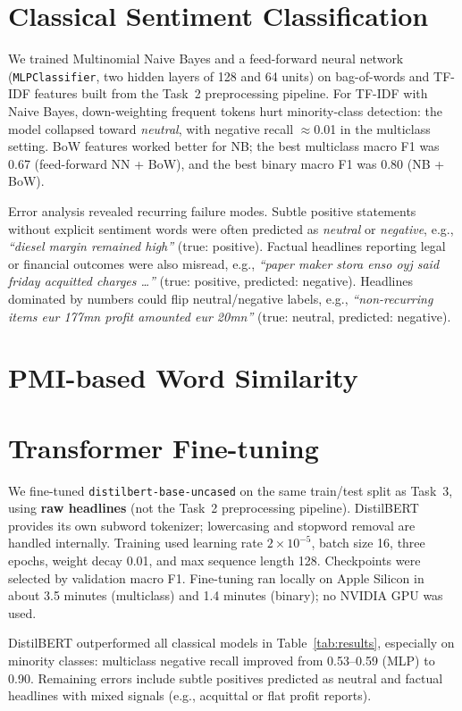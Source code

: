 \documentclass[sigconf,nonacm]{acmart}
\begin{document}
\section{Classical Sentiment Classification}

We trained Multinomial Naive Bayes and a feed-forward neural network
(\texttt{MLPClassifier}, two hidden layers of 128 and 64 units) on bag-of-words
and TF-IDF features built from the Task~2 preprocessing pipeline.
For TF-IDF with Naive Bayes, down-weighting frequent tokens hurt minority-class
detection: the model collapsed toward \emph{neutral}, with negative recall
$\approx$0.01 in the multiclass setting.
BoW features worked better for NB; the best multiclass macro F1 was
0.67 (feed-forward NN + BoW), and the best binary macro F1 was 0.80 (NB + BoW).

Error analysis revealed recurring failure modes.
Subtle positive statements without explicit sentiment words were often predicted
as \emph{neutral} or \emph{negative}, e.g.,
\emph{``diesel margin remained high''} (true: positive).
Factual headlines reporting legal or financial outcomes were also misread, e.g.,
\emph{``paper maker stora enso oyj said friday acquitted charges \ldots''}
(true: positive, predicted: negative).
Headlines dominated by numbers could flip neutral/negative labels, e.g.,
\emph{``non-recurring items eur 177mn profit amounted eur 20mn''}
(true: neutral, predicted: negative).

\section{PMI-based Word Similarity}

\section{Transformer Fine-tuning}

We fine-tuned \texttt{distilbert-base-uncased} on the same train/test split as
Task~3, using \textbf{raw headlines} (not the Task~2 preprocessing pipeline).
DistilBERT provides its own subword tokenizer; lowercasing and stopword removal
are handled internally.
Training used learning rate $2\times10^{-5}$, batch size 16, three epochs,
weight decay 0.01, and max sequence length 128.
Checkpoints were selected by validation macro F1.
Fine-tuning ran locally on Apple Silicon in about 3.5 minutes (multiclass) and
1.4 minutes (binary); no NVIDIA GPU was used.

DistilBERT outperformed all classical models in Table~\ref{tab:results},
especially on minority classes: multiclass negative recall improved from
0.53--0.59 (MLP) to 0.90.
Remaining errors include subtle positives predicted as neutral and factual
headlines with mixed signals (e.g., acquittal or flat profit reports).
\end{document}
